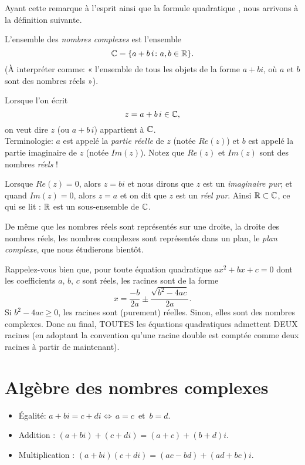 Ayant cette remarque à l'esprit ainsi que la formule quadratique
, nous arrivons à la définition suivante.

\begin{definition}
L'ensemble des \emph{nombres complexes} est l'ensemble
$$
\mathbb{C} = \{ a+b\,i \colon a, b \in \mathbb{R} \}.
$$
\noindent(\`A interpréter comme:  « l'ensemble de tous les objets de la forme $a+bi$, où $a$ et
$b$ sont des nombres réels »).

Lorsque l'on écrit
$$
z =a +b\,i \in \mathbb{C},
$$
on veut dire  $z$ (ou $a+b\,i $) appartient à $\mathbb{C} $.\\
\indent Terminologie:
$a$ est appelé la \emph{partie réelle} de $z$ (notée $Re(z)$) et $b$ est appelé
la partie imaginaire de $z$ (notée $Im(z)$).  Notez que $Re(z)$ et $Im(z)$ sont des nombres \emph{réels} !


Lorsque $Re(z)=0$, alors $z=bi $ et nous dirons que $z $ est un \emph{imaginaire pur}; et
quand $Im(z)=0$, alors $z=a$ et on dit que $z$ est un \emph{réel pur}.  Ainsi $\mathbb{R} \subset \mathbb{C}$, ce qui se lit :  $\mathbb{R}$
est un sous-ensemble de $\mathbb{C}$.

\end{definition}

De même que les nombres réels sont représentés sur une droite, la droite des nombres réels, les nombres complexes sont représentés dans un plan, 
le \emph{plan complexe}, que nous étudierons bientôt.

Rappelez-vous bien que, pour toute équation quadratique $ax^2+bx+c=0$ dont les coefficients $a,\, b,\, c$ sont réels, les racines sont de la forme $$x = \frac{-b}{2a} \pm \frac{\sqrt{b^2-4ac}}{2a}. $$ Si $b^2-4ac \geq 0$, les racines sont (purement) réelles. Sinon, elles sont des nombres complexes.  Donc au final, TOUTES les équations quadratiques admettent DEUX racines (en adoptant la convention qu'une racine double est comptée comme deux racines à partir de maintenant).

\section{Algèbre des nombres complexes}

\begin{itemize}
\item Égalité: $a+bi = c+di \Leftrightarrow\,  a=c\, \textrm{ et }\, b=d$.
\item Addition : $(a+bi) + (c+di) = (a+c) + (b+d)i$.
\item Multiplication : $(a+bi)(c+di) = (ac-bd) + (ad+bc)i$.
\end{itemize}

